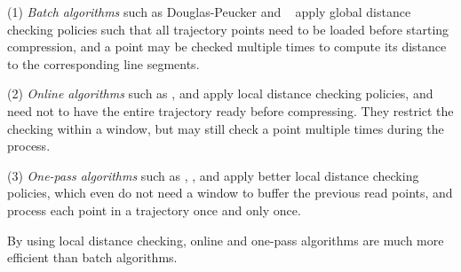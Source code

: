 \ni (1) {\em Batch algorithms} such as Douglas-Peucker\cite{Douglas:Peucker,Meratnia:Spatiotemporal} and \pavlidis~\cite{Pavlidis:Segment} apply global distance checking policies such that all trajectory points need to be loaded before starting compression, and a point may be checked multiple times to compute its distance to the corresponding line segments.

\ni (2) {\em Online algorithms} such as \opwa \cite{Meratnia:Spatiotemporal}, \squishe \cite{Muckell:SQUISH} and \bqsa \cite{Liu:BQS} apply local distance checking policies, and need not to have the entire trajectory ready before compressing. They restrict the checking within a window, but may still check a point  multiple times during the process.

\ni (3) {\em One-pass algorithms} such as \operb\cite{Lin:Operb}, \siped  \cite{Williams:Longest,Sklansky:Cone,Dunham:Cone, Zhao:Sleeve}, \cised \cite{Lin:Cised} and \interval \cite{Ke:Interval} apply better local distance checking policies, which even do not need a window to buffer the previous read points, and process each point in a trajectory once and only once.

By using local distance checking, online and one-pass algorithms are much more efficient than batch algorithms.




